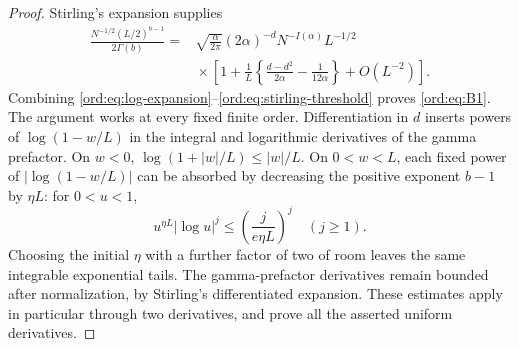 \begin{proof}
Stirling's expansion supplies
\begin{equation}\label{ord:eq:stirling-threshold}
 \begin{split}
 \frac{N^{-1/2}(L/2)^{b-1}}{2\Gamma(b)}
 ={}&\sqrt{\frac\alpha{2\pi}}(2\alpha)^{-d}
       N^{-I(\alpha)}L^{-1/2}\\
 &\mathrel{}\times\left[1+\frac1L
       \left\{\frac{d-d^2}{2\alpha}-\frac1{12\alpha}\right\}
         +O(L^{-2})\right].
 \end{split}
\end{equation}
Combining \eqref{ord:eq:log-expansion}--\eqref{ord:eq:stirling-threshold}
proves \eqref{ord:eq:B1}. The argument works at every fixed finite
order. Differentiation in $d$ inserts powers of $\log(1-w/L)$ in the
integral and logarithmic derivatives of the gamma prefactor. On $w<0$,
$\log(1+|w|/L)\le |w|/L$. On $0<w<L$, each fixed power of
$|\log(1-w/L)|$ can be absorbed by decreasing the positive exponent
$b-1$ by $\eta L$: for $0<u<1$,
\[
 u^{\eta L}|\log u|^j\le\left(\frac{j}{e\eta L}\right)^j
 \quad(j\ge1).
\]
Choosing the initial $\eta$ with a further factor of two of room leaves
the same integrable exponential tails. The gamma-prefactor derivatives
remain bounded after normalization, by Stirling's differentiated
expansion. These estimates apply in particular through two derivatives,
and prove all the asserted uniform derivatives.
\end{proof}

